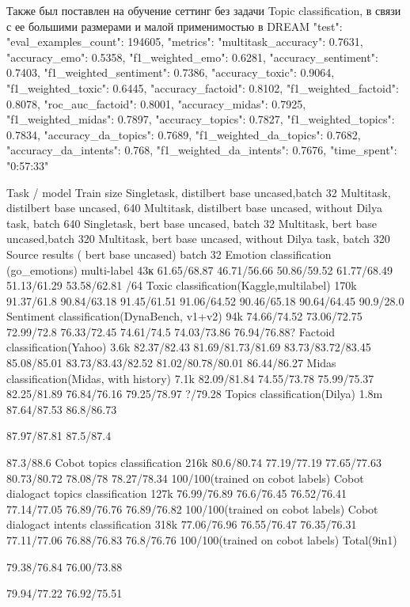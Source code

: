 Также был поставлен на обучение сеттинг без задачи Topic classification, в связи с ее большими размерами и малой применимостью в DREAM
{"test": {"eval_examples_count": 194605, "metrics": {"multitask_accuracy": 0.7631, "accuracy_emo": 0.5358, "f1_weighted_emo": 0.6281, "accuracy_sentiment": 0.7403, "f1_weighted_sentiment": 0.7386, "accuracy_toxic": 0.9064, "f1_weighted_toxic": 0.6445, "accuracy_factoid": 0.8102, "f1_weighted_factoid": 0.8078, "roc_auc_factoid": 0.8001, "accuracy_midas": 0.7925, "f1_weighted_midas": 0.7897, "accuracy_topics": 0.7827, "f1_weighted_topics": 0.7834, "accuracy_da_topics": 0.7689, "f1_weighted_da_topics": 0.7682, "accuracy_da_intents": 0.768, "f1_weighted_da_intents": 0.7676}, "time_spent": "0:57:33"}}


Task / model
Train size
Singletask, distilbert base uncased,batch 32
Multitask, distilbert base uncased, 640 
Multitask, distilbert base uncased, without Dilya task, batch 640
Singletask, bert base uncased, batch 32
Multitask, bert base uncased,batch 320
Multitask, bert base uncased, without Dilya task, batch 320
Source results ( bert base uncased)
batch 32
Emotion classification (go_emotions)
multi-label
43к
61.65/68.87
46.71/56.66
50.86/59.52
61.77/68.49
51.13/61.29
53.58/62.81
/64
Toxic classification(Kaggle,multilabel)
170k
91.37/61.8
90.84/63.18
91.45/61.51
91.06/64.52
90.46/65.18
90.64/64.45
90.9/28.0
Sentiment classification(DynaBench, v1+v2)
94k
74.66/74.52
73.06/72.75
72.99/72.8
76.33/72.45
74.61/74.5
74.03/73.86
76.94/76.88?
Factoid classification(Yahoo)
3.6k
82.37/82.43
81.69/81.73/81.69
83.73/83.72/83.45
85.08/85.01
83.73/83.43/82.52
81.02/80.78/80.01
86.44/86.27
Midas classification(Midas, with history)
7.1k
82.09/81.84
74.55/73.78
75.99/75.37
82.25/81.89
76.84/76.16
79.25/78.97
?/79.28
Topics classification(Dilya)
1.8m
87.64/87.53
86.8/86.73


87.97/87.81
87.5/87.4


87.3/88.6
Cobot topics classification
216k
80.6/80.74
77.19/77.19
77.65/77.63
80.73/80.72
78.08/78
78.27/78.34
100/100(trained on cobot labels)
Cobot dialogact topics classification
127k
76.99/76.89
76.6/76.45
76.52/76.41
77.14/77.05
76.89/76.76
76.89/76.82
100/100(trained on cobot labels)
Cobot dialogact intents classification
318k
77.06/76.96
76.55/76.47
76.35/76.31
77.11/77.06
76.88/76.83
76.8/76.76
100/100(trained on cobot labels)
Total(9in1)


79.38/76.84
76.00/73.88


79.94/77.22
76.92/75.51




